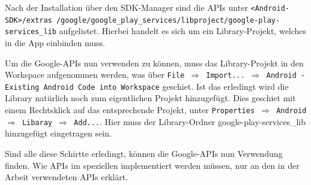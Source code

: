 Nach der Installation \"uber den \ac{SDK}-Manager sind die APIs unter \texttt{<Android-SDK>/extras /google/google\_play\_services/libproject/google-play-services\_lib} aufgelistet. Hierbei handelt es sich um ein Library-Projekt, welches in die App einbinden muss.

Um die Google-APIs nun verwenden zu k\"onnen, muss das Library-Projekt in den Workspace aufgenommen werden, was \"uber \texttt{File $\Rightarrow$ Import... $\Rightarrow$ Android - Existing Android Code into Workspace} geschiet. Ist das erledingt wird die Library nat\"urlich noch zum eigentlichen Projekt hinzugef\"ugt. Dies geschiet mit einem Rechtsklick auf das entsprechende Projekt, unter \texttt{Properties $\Rightarrow$ Android $\Rightarrow$ Libaray $\Rightarrow$ Add...}. Hier muss der Library-Ordner google-play-services\_lib hinzugef\"ugt eingetragen sein.

Sind alle diese Schirtte erledingt, k\"onnen die Google-APIs nun Verwendung finden. Wie APIs im speziellen implementiert werden m\"ussen, nur an den in der Arbeit verwendeten APIs erkl\"art. \cite{ApiAccess} \cite{GolemHBGoogleServices}